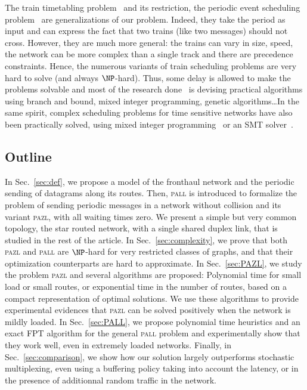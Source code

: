 \documentclass[a4paper,10pt]{article}
\newcommand\pazl{\textsc{pazl}\xspace}
\newcommand\pall{\textsc{pall}\xspace}
\begin{document}
The train timetabling problem~\cite{lusby2011railway} and its restriction, the periodic event scheduling problem~\cite{serafini1989mathematical} are generalizations of our problem. Indeed, they take the period as input and can express the fact that two trains (like two messages) should not cross. However, they are much more general: the trains can vary in size, speed, the network can be more complex than a single track and there are precedence constraints. Hence, the numerous variants of train scheduling problems are very hard to solve (and always $\NP$-hard). Thus, some delay is allowed to make the problems solvable and most of the research done~\cite{lusby2011railway} is devising practical algorithms using branch and bound, mixed integer programming, genetic algorithms\dots  In the same spirit, complex scheduling problems for time sensitive networks have also been practically solved, using mixed integer programming~\cite{nayak2017incremental,steiner2018traffic} or an SMT solver~\cite{dos2019tsnsched}.


\subsection*{Outline}

 In Sec.~\ref{sec:def}, we propose a model of the fronthaul network and the periodic sending of datagrams along its routes. Then, \pall is introduced to formalize the problem of sending periodic messages in a network without collision and its variant \pazl, with all waiting times zero. We present a simple but very common topology, the star routed network, with a single shared duplex link, that is studied in the rest of the article.  In Sec.~\ref{sec:complexity}, we prove that both \pazl and \pall are $\NP$-hard for very restricted classes of graphs, and that their optimization counterparts are hard to approximate. 
 In Sec.~\ref{sec:PAZL}, we study the problem \pazl and several algorithms are proposed: Polynomial time for small load or small routes, or exponential time in the number of routes, based on a compact representation of optimal solutions. We use these algorithms to provide experimental evidences that \pazl can be solved positively when the network is mildly loaded. In Sec.~\ref{sec:PALL}, we propose polynomial time heuristics and an exact FPT algorithm for the general \pall problem and experimentally show that they work well, even in extremely loaded networks. 
Finally, in Sec.~\ref{sec:comparison}, we show how our solution largely outperforms stochastic multiplexing, even using a buffering policy taking into account the latency, or in the presence of additionnal random traffic in the network.
\end{document}
